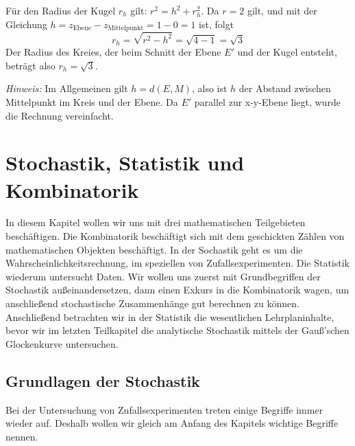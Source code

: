 \documentclass[ngerman, 12pt]{nssheetxea}
\begin{document}
\begin{example}
\begin{center}
\end{center}
Für den Radius der Kugel $r_h$ gilt: $r^2 = h^2 + r_h^2$. Da $r=2$ gilt, und mit der Gleichung $h=z_{\mathrm{Ebene}}-z_{\mathrm{Mittelpunkt}} = 1 - 0 = 1$ ist, folgt
\[ r_h = \sqrt{r^2-h^2} = \sqrt{4-1} = \sqrt{3}   \] 
Der Radius des Kreies, der beim Schnitt der Ebene $E'$ und der Kugel entsteht, beträgt also $r_h=\sqrt{3}$. \par
\textit{Hinweis:} Im Allgemeinen gilt $h=d(E,M)$, also ist $h$ der Abstand zwischen Mittelpunkt im Kreis und der Ebene. Da $E'$ parallel zur x-y-Ebene liegt, wurde die Rechnung vereinfacht.
\end{example}

\newpage
\section{Stochastik, Statistik und Kombinatorik}
In diesem Kapitel wollen wir uns mit drei mathematischen Teilgebieten beschäftigen. Die Kombinatorik beschäftigt sich mit dem geschickten Zählen von mathematischen Objekten beschäftigt. In der Sochastik geht es um die Wahrscheinlichkeitsrechnung, im speziellen von Zufallsexperimenten. Die Statistik wiederum untersucht Daten. Wir wollen uns zuerst mit Grundbegriffen der Stochastik außeinandersetzen, dann einen Exkurs in die Kombinatorik wagen, um anschließend stochastische Zusammenhänge gut berechnen zu können. Anschließend betrachten wir in der Statistik die wesentlichen Lehrplaninhalte, bevor wir im letzten Teilkapitel die analytische Stochastik mittels der Gauß'schen Glockenkurve untersuchen.

\subsection{Grundlagen der Stochastik}
Bei der Untersuchung von Zufallsexperimenten treten einige Begriffe immer wieder auf. Deshalb wollen wir gleich am Anfang des Kapitels wichtige Begriffe nennen.
\end{document}
